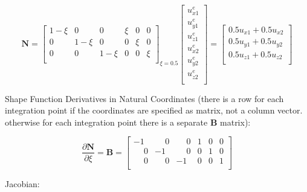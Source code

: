 \documentclass[10pt,b5paper,titlepage]{book}
\newcommand{\m}{\mathbf}
\begin{document}
\begin{equation}
    \m{N} = \begin{bmatrix}
        1 - \xi & 0 & 0 & \xi & 0 & 0 \\
        0 & 1 - \xi & 0 & 0 & \xi & 0  \\
        0 & 0 & 1 - \xi & 0 & 0 & \xi \\
    \end{bmatrix}_{\xi = 0.5}
    \begin{bmatrix}
        u_{x1}^e \\
        u_{y1}^e \\
        u_{z1}^e \\
        u_{x2}^e \\
        u_{y2}^e \\
        u_{z2}^e \\
    \end{bmatrix}
    = \begin{bmatrix}
        0.5 u_{x1} + 0.5 u_{x2} \\
        0.5 u_{y1} + 0.5 u_{y2} \\
        0.5 u_{z1} + 0.5 u_{z2} \\
    \end{bmatrix}
\end{equation}

Shape Function Derivatives in Natural Coordinates (there is a row for each
integration point if the coordinates are specified as matrix, not a column
vector. otherwise for each integration point there is a separate $ \m{B} $
matrix):

\begin{equation}
    \frac{\partial \m{N}}{\partial \xi} =
    \m{B} = \begin{bmatrix}
        -1 & \phantom{-}0 & \phantom{-}0 & 1 & 0 & 0 \\
        \phantom{-}0 & -1 & \phantom{-}0 & 0 & 1 & 0  \\
        \phantom{-}0 & \phantom{-}0 & -1 & 0 & 0 & 1  \\
    \end{bmatrix}
\end{equation}

Jacobian:
\end{document}

